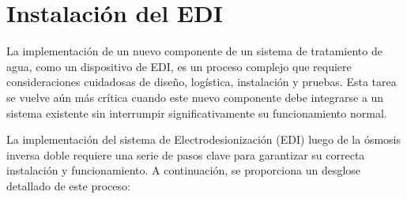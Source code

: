 





\section{Instalación del EDI }
\label{sec:implementation_start}

La implementación de un nuevo componente de un sistema de tratamiento de agua,
como un dispositivo de EDI, es un proceso complejo que requiere consideraciones
cuidadosas de diseño, logística, instalación y pruebas. Esta tarea se vuelve
aún más crítica cuando este nuevo componente debe integrarse a un sistema
existente sin interrumpir significativamente su funcionamiento normal.

La implementación del sistema de Electrodesionización (EDI) luego de la ósmosis inversa doble requiere una serie de pasos clave para garantizar su correcta instalación y funcionamiento. A continuación, se proporciona un desglose detallado de este proceso:

